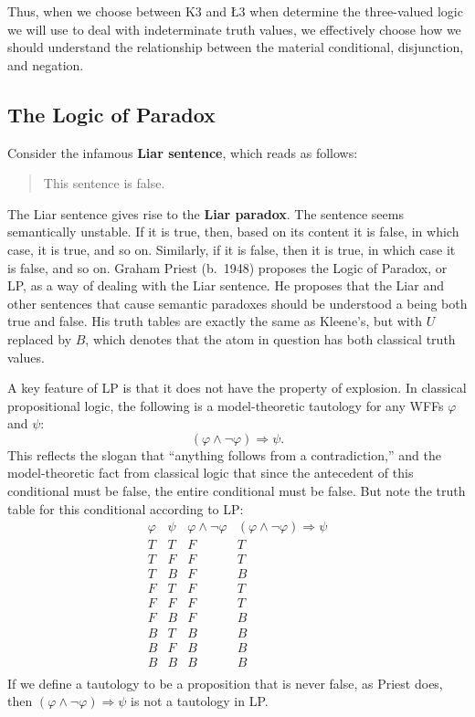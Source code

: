 \documentclass[11pt]{article}
\theoremstyle{definition}
\theoremstyle{remark}
\begin{document}
\noindent
Thus, when we choose between K3 and Ł3 when determine the three-valued logic we will use to deal with indeterminate truth values, we effectively choose how we should understand the relationship between the material conditional, disjunction, and negation.\par 


\subsection{The Logic of Paradox}
Consider the infamous \textbf{Liar sentence}, which reads as follows:
\begin{quote}
    This sentence is false.
\end{quote}
The Liar sentence gives rise to the \textbf{Liar paradox}. The sentence seems semantically unstable. If it is true, then, based on its content it is false, in which case, it is true, and so on. Similarly, if it is false, then it is true, in which case it is false, and so on. Graham Priest (b.\ 1948) proposes the Logic of Paradox, or LP, as a way of dealing with the Liar sentence. He proposes that the Liar and other sentences that cause semantic paradoxes should be understood a being both true and false. His truth tables are exactly the same as Kleene's, but with $U$ replaced by $B$, which denotes that the atom in question has both classical truth values.\par 

A key feature of LP is that it does not have the property of explosion. In classical propositional logic, the following is a model-theoretic tautology for any WFFs $\varphi$ and $\psi$: $$(\varphi\wedge\neg\varphi)\Rightarrow\psi.$$
This reflects the slogan that ``anything follows from a contradiction,'' and the model-theoretic fact from classical logic that since the antecedent of this conditional must be false, the entire conditional must be false. But note the truth table for this conditional according to LP:
\noindent
\[
\begin{array}{c|c|c|c}
\varphi & \psi & \varphi \wedge \neg \varphi & (\varphi \wedge \neg \varphi) \Rightarrow \psi \\
\hline
T & T & F & T \\
T & F & F & T \\
T & B & F & B \\
F & T & F & T \\
F & F & F & T \\
F & B & F & B \\
B & T & B & B \\
B & F & B & B \\
B & B & B & B \\
\end{array}
\]
If we define a tautology to be a proposition that is never false, as Priest does, then $(\varphi\wedge\neg\varphi)\Rightarrow\psi$ is not a tautology in LP.\par 
\end{document}
